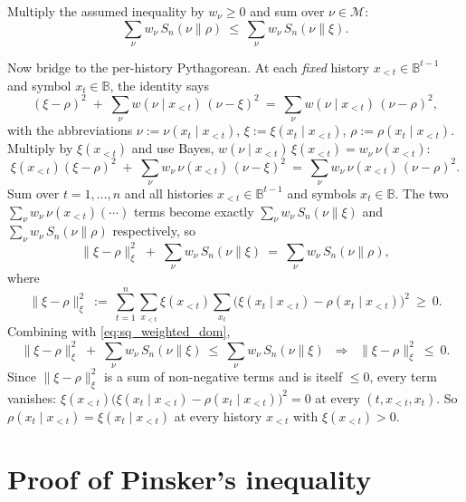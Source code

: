 \documentclass[fontsize=11pt, parskip=half]{scrartcl}
\theoremstyle{definition}
\newenvironment{solution}{%
    \begin{tcolorbox}[colback=black!5!white, colframe=black!50!white,
      title={\textbf{Solution}}, fonttitle=\normalfont, breakable]
  }{\end{tcolorbox}}
\newenvironment{solution}{\expandafter\comment}{\expandafter\endcomment}
\renewcommand{\thesection}{\arabic{section}}
\newcommand{\Mc}{\mathcal{M}}
\newcommand{\Sn}[2]{S_{n}(#1 \parallel #2)}
\begin{document}
\begin{solution}
Multiply the assumed inequality by $w_\nu \geq 0$ and sum over $\nu \in \Mc$:
\begin{equation}\label{eq:sq_weighted_dom}
  \sum_\nu w_\nu\,\Sn{\nu}{\rho}
  ~\leq~
  \sum_\nu w_\nu\,\Sn{\nu}{\xi}.
\end{equation}

Now bridge to the per-history Pythagorean. At each \emph{fixed} history $x_{<t}
\in \mathbb{B}^{t-1}$ and symbol $x_t \in \mathbb{B}$, the identity says
\[
  (\xi - \rho)^2 \;+\; \sum_\nu w(\nu \mid x_{<t})\,(\nu - \xi)^2
  ~=~ \sum_\nu w(\nu \mid x_{<t})\,(\nu - \rho)^2,
\]
with the abbreviations $\nu := \nu(x_t \mid x_{<t})$, $\xi := \xi(x_t \mid x_{<t})$,
$\rho := \rho(x_t \mid x_{<t})$. Multiply by $\xi(x_{<t})$ and use Bayes,
$w(\nu \mid x_{<t})\,\xi(x_{<t}) = w_\nu \,\nu(x_{<t})$:
\[
  \xi(x_{<t})(\xi - \rho)^2
  \;+\; \sum_\nu w_\nu \,\nu(x_{<t})\,(\nu - \xi)^2
  ~=~ \sum_\nu w_\nu \,\nu(x_{<t})\,(\nu - \rho)^2.
\]
Sum over $t = 1, \dots, n$ and all histories $x_{<t} \in \mathbb{B}^{t-1}$ and
symbols $x_t \in \mathbb{B}$. The two $\sum_\nu w_\nu \,\nu(x_{<t})(\cdots)$
terms become exactly $\sum_\nu w_\nu \,\Sn{\nu}{\xi}$ and $\sum_\nu w_\nu \,
\Sn{\nu}{\rho}$ respectively, so
\[
  \|\xi - \rho\|_\xi^2
  \;+\; \sum_\nu w_\nu\,\Sn{\nu}{\xi}
  ~=~
  \sum_\nu w_\nu\,\Sn{\nu}{\rho},
\]
where
\[
  \|\xi - \rho\|_\xi^2 ~:=~
  \sum_{t=1}^n \sum_{x_{<t}} \xi(x_{<t}) \sum_{x_t}
    \bigl(\xi(x_t \mid x_{<t}) - \rho(x_t \mid x_{<t})\bigr)^2 ~\geq~ 0.
\]
Combining with \cref{eq:sq_weighted_dom},
\[
  \|\xi - \rho\|_\xi^2 \;+\; \sum_\nu w_\nu\,\Sn{\nu}{\xi}
  ~\leq~ \sum_\nu w_\nu\,\Sn{\nu}{\xi}
  \;\;\Longrightarrow\;\;
  \|\xi - \rho\|_\xi^2 ~\leq~ 0.
\]
Since $\|\xi - \rho\|_\xi^2$ is a sum of non-negative terms and is itself
$\leq 0$, every term vanishes:
$\xi(x_{<t})\bigl(\xi(x_t \mid x_{<t}) - \rho(x_t \mid x_{<t})\bigr)^2 = 0$
at every $(t, x_{<t}, x_t)$. So $\rho(x_t \mid x_{<t}) = \xi(x_t \mid x_{<t})$
at every history $x_{<t}$ with $\xi(x_{<t}) > 0$. \qedhere
\end{solution}

\clearpage
\appendix
\renewcommand{\thesection}{\Alph{section}}

\section{Proof of Pinsker's inequality}\label{app:pinsker}
\end{document}

